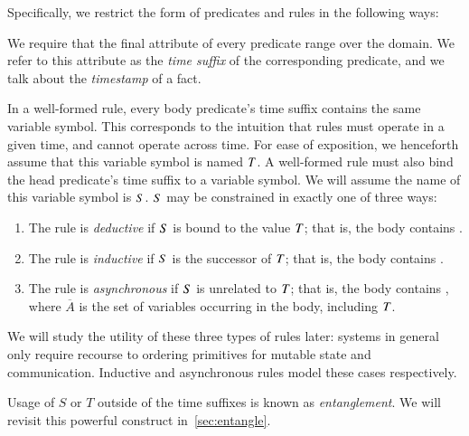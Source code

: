 Specifically, we restrict the form of predicates and rules in the following ways:

We require that the final attribute of every \lang
predicate range over the  domain.  
We refer to this attribute as the \emph{time suffix} of the corresponding
predicate, and we talk about the {\em timestamp} of a fact. 


In a well-formed \lang rule, every body predicate's time suffix contains the
same variable symbol.  This corresponds to the intuition that rules must
operate in a given time, and cannot operate across time.  For ease of exposition, we henceforth assume that this
variable symbol is named $\DT$.  A well-formed \lang rule must also bind the
head predicate's time suffix to a variable symbol.  We will assume the name of
this variable symbol is $\DS$.  $\DS$ may be constrained in exactly one of
three ways:

\begin{enumerate}
%
\item The rule is {\em deductive} if $\DS$ is bound to the value
$\DT$; that is, the body contains \dedalus{$\DS$ = $\DT$}.
%
\item The rule is {\em inductive} if $\DS$ is the successor of
$\DT$; that is, the body contains .
%
\item The rule is {\em asynchronous} if $\DS$ is unrelated to $\DT$;
that is, the body contains , where $\overline{A}$ is the set of variables occurring in the body,
including $\DT$.
%
\end{enumerate}

We will study the utility of these three types of rules later: systems in
general only require recourse to ordering primitives for mutable state and communication.
Inductive and asynchronous rules model these cases respectively.

Usage of $S$ or $T$ outside of the time suffixes is known as {\em
entanglement}.  We will revisit this powerful construct in~\ref{sec:entangle}. 

